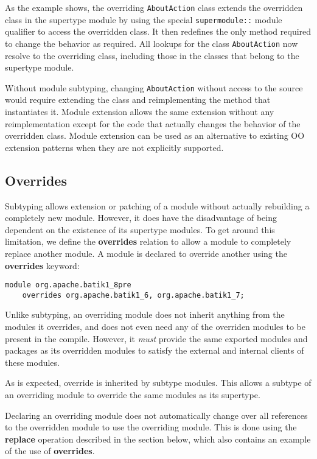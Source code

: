 As the example shows, the overriding \texttt{AboutAction} class extends the
overridden class in the supertype module by using the special 
\texttt{supermodule::} module qualifier to access the overridden class. It
then redefines the only method required to change the behavior as required.
All lookups for the class \texttt{AboutAction} now resolve to the overriding
class, including those in the classes that belong to the supertype module.

Without module subtyping, changing \texttt{AboutAction} without access to the source
would require extending the class and reimplementing the method 
that instantiates it. Module extension allows the same extension without
any reimplementation except for the code that actually changes the behavior of the overridden class.
Module extension can be used as an alternative to existing OO extension patterns when they
are not explicitly supported.

\subsection{Overrides}

Subtyping allows extension or patching of a module without actually
rebuilding a completely new module. However, it does have the disadvantage
of being dependent on the existence of its supertype modules. To get
around this limitation, we define the \textbf{overrides} relation to allow
a module to completely replace another module. A module is declared
to override another using the \textbf{overrides} keyword:

\begin{lstlisting}
module org.apache.batik1_8pre 
	overrides org.apache.batik1_6, org.apache.batik1_7;
\end{lstlisting}

Unlike subtyping, an overriding module does not inherit anything from the
modules it overrides, and does not even need any of the overriden modules to
be present in the compile. However, it \textit{must} provide the same exported modules
and packages as its overridden modules to satisfy the external and internal
clients of these modules. 

As is expected, override is inherited by subtype modules. This allows a subtype
of an overriding module to override the same modules as its supertype.

Declaring an overriding module does not automatically change over all references
to the overridden module to use the overriding module. This is done using the
\textbf{replace} operation described in the section below, which also contains
an example of the use of \textbf{overrides}.


